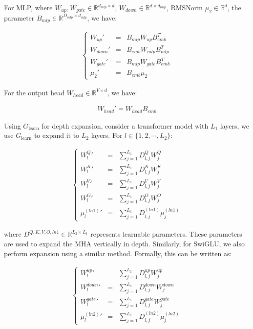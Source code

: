 \documentclass{article}
\begin{document}
For MLP, where $W_{up}, W_{gate} \in \mathbb{R}^{d_{mlp} \times d}$, $W_{down} \in \mathbb{R}^{d \times d_{mlp}}$, RMSNorm $\mu_2 \in \mathbb{R}^d$, the parameter $B_{mlp} \in \mathbb{R}^{D_{mlp} \times d_{mlp}}$, we have:

\begin{eqnarray}
\left\{\begin{matrix}
W_{up}' &=& B_{mlp}W_{up}B_{emb}^T \\
W_{down}' &=& B_{emb}W_{mlp}B_{mlp}^T \\
W_{gate}' &=& B_{mlp}W_{gate}B_{emb}^T \\
\mu_2' &=& B_{emb}\mu_2
\end{matrix}\right.
\end{eqnarray}

For the output head $W_{head} \in \mathbb{R}^{V \times d}$, we have:

\begin{eqnarray}
W_{head}' = W_{head}B_{emb}
\end{eqnarray}

Using $G_{\text{learn}}$ for depth expansion, consider a transformer model with $L_1$ layers, we use $G_{\text{learn}}$ to expand it to $L_2$ layers. For $l \in \{1, 2, \cdots, L_2\}$:

\begin{eqnarray}
\left\{\begin{matrix}
{W_l^Q}' &=& \sum_{j=1}^{L_1} D_{l,j}^Q W_j^Q \\
{W_l^K}' &=& \sum_{j=1}^{L_1} D_{l,j}^K W_j^K \\
{W_l^V}' &=& \sum_{j=1}^{L_1} D_{l,j}^V W_j^V \\
{W_l^O}' &=& \sum_{j=1}^{L_1} D_{l,j}^O W_j^O \\
{\mu_l^{(ln1)}}' &=& \sum_{j=1}^{L_1} D_{l,j}^{(ln1)} \mu_j^{(ln1)}
\end{matrix}\right.
\end{eqnarray}

where $D^{Q, K, V, O, ln1} \in \mathbb{R}^{L_2 \times L_1}$ represents learnable parameters. These parameters are used to expand the MHA vertically in depth. Similarly, for SwiGLU, we also perform expansion using a similar method. Formally, this can be written as:

\begin{eqnarray}
\left\{\begin{matrix}
{W_l^{up}}' &=& \sum_{j=1}^{L_1} D_{l,j}^{up} W_j^{up} \\
{W_l^{down}}' &=& \sum_{j=1}^{L_1} D_{l,j}^{down} W_j^{down} \\
{W_l^{gate}}' &=& \sum_{j=1}^{L_1} D_{l,j}^{gate} W_j^{gate} \\
{\mu_l^{(ln2)}}' &=& \sum_{j=1}^{L_1} D_{l,j}^{(ln2)} \mu_j^{(ln2)}
\end{matrix}\right.
\end{eqnarray}
\end{document}
